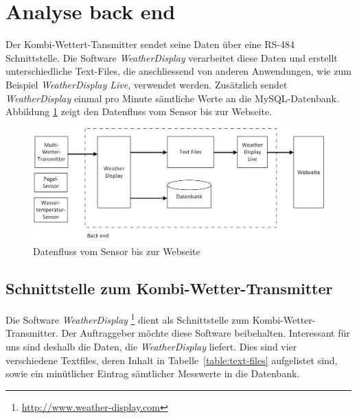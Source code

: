 \section{Analyse back end}
Der Kombi-Wettert-Tansmitter sendet seine Daten über eine RS-484 Schnittstelle. Die Software \textit{WeatherDisplay} verarbeitet diese Daten und erstellt unterschiedliche Text-Files, die anschliessend von anderen Anwendungen, wie zum Beispiel \textit{WeatherDisplay Live}, verwendet werden. Zusätzlich sendet \textit{WeatherDisplay} einmal pro Minute sämtliche Werte an die MySQL-Datenbank. Abbildung \ref{img:datenfluss} zeigt den Datenfluss vom Sensor bis zur Webseite. 

\begin{figure}[h!]
	\centering
	\includegraphics[width=1\linewidth]{img/datenfluss}
	\caption{Datenfluss vom Sensor bis zur Webseite}
	\label{img:datenfluss}
\end{figure}



\subsection{Schnittstelle zum Kombi-Wetter-Transmitter}
Die Software \textit{WeatherDisplay} \footnote{ \url{http://www.weather-display.com}} dient als Schnittstelle zum Kombi-Wetter-Transmitter. Der Auftraggeber möchte diese Software beibehalten. Interessant für uns sind deshalb die Daten, die  \textit{WeatherDisplay} liefert. Dies sind vier verschiedene Textfiles, deren Inhalt in Tabelle~\ref{table:text-files} aufgelistet sind, sowie ein minütlicher Eintrag sämtlicher Messwerte in die Datenbank.
\newline

